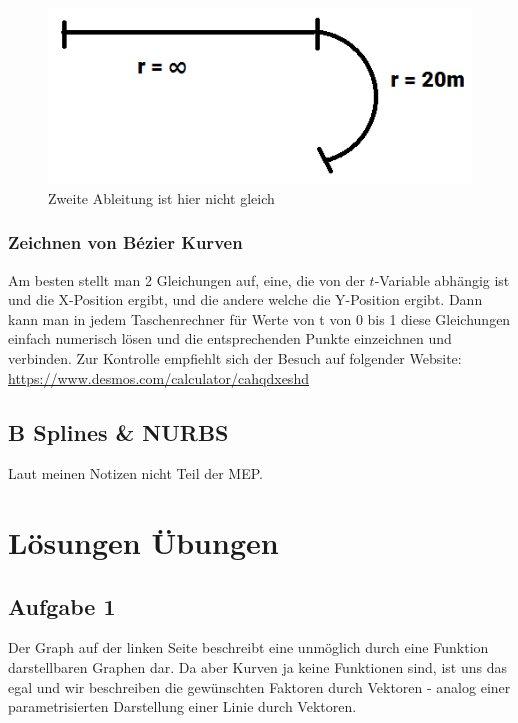 \begin{figure}[!ht]
	\centering
	\includegraphics[width=0.2\linewidth]{fig/c2_stetigkeit}
	\caption{Zweite Ableitung ist hier nicht gleich}
	\label{fig:c2_stetigkeit}
\end{figure}
\subsubsection{Zeichnen von Bézier Kurven}
Am besten stellt man 2 Gleichungen auf, eine, die von der \(t\)-Variable abhängig ist und die X-Position ergibt, und die andere welche die Y-Position ergibt. Dann kann man in jedem Taschenrechner für Werte von t von 0 bis 1 diese Gleichungen einfach numerisch lösen und die entsprechenden Punkte einzeichnen und verbinden. Zur Kontrolle empfiehlt sich der Besuch auf folgender Website: \url{https://www.desmos.com/calculator/cahqdxeshd}
\subsection{B Splines \& NURBS}
Laut meinen Notizen nicht Teil der MEP.
\section{Lösungen Übungen}
\subsection{Aufgabe 1}
Der Graph auf der linken Seite beschreibt eine unmöglich durch eine Funktion darstellbaren Graphen dar. Da aber Kurven ja keine Funktionen sind, ist uns das egal und wir beschreiben die gewünschten Faktoren durch Vektoren - analog einer parametrisierten Darstellung einer Linie durch Vektoren.\\ \newline

